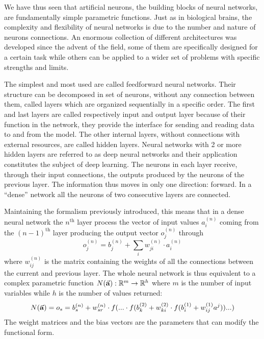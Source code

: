 \documentclass[a4paper,10pt]{report}
\begin{document}

We have thus seen that artificial neurons, the building blocks of neural networks,
are fundamentally simple parametric functions.
Just as in biological brains, the complexity and flexibility
of neural networks is due to the number and nature of neurons connections.
An enormous collection of different architectures was developed since the advent of the field,
some of them are specifically designed for a certain task while others can be applied
to a wider set of problems with specific strengths and limits.

The simplest and most used are called feedforward neural networks.
Their structure can be decomposed in set of neurons, without any connection between them, called layers which are
organized sequentially in a specific order.
The first and last layers are called respectively input and output layer because of
their function in the network, they provide the interface for sending and reading data to and from 
the model. The other internal layers, without connections with external resources, are called hidden layers.
Neural networks with 2 or more hidden layers are referred to as deep neural networks and their
application constitutes the subject of deep learning.
The neurons in each layer receive, through their input connections,
the outputs produced by the neurons of the previous layer.  The information thus moves in
only one direction: forward. In a ``dense'' network all the neurons of two consecutive layers
are connected.

Maintaining the formalism previously introduced, this means that in a dense 
neural network the $n^{\text{th}}$ layer process the vector of input values 
$a_i^{(n)}$ coming from the $(n-1)^{\text{th}}$ layer producing the output vector $o_j^{(n)}$ through
\begin{equation}
    o_j^{(n)} = b_j^{(n)} + \sum_i w^{(n)}_{ji}\cdot a^{(n)}_i
\end{equation}
where $w^{(n)}_{ij}$ is the matrix containing the weights of all the connections between the current and previous layer.
The whole neural network is thus equivalent to a complex parametric function $N (\va a): \mathbb{R}^m \rightarrow \mathbb{R}^h$ where $m$ is 
the number of input variables while $h$ is the number of values returned:
\begin{equation}
    N(\va a) = o_s = b_s^{(n)} + w^{(n)}_{sr} 
    \cdot f( ... \cdot f( b_k^{(2)} + w_{ki}^{(2)} \cdot f(b_i^{(1)} + w_{ij}^{(1)}a^j)) ... )
\end{equation}
The weight matrices and the bias vectors are the parameters that can modify the functional form.
\end{document}

